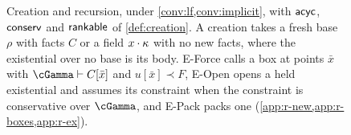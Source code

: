 \begin{figure}[tbp]
  \small
  \figrule
  \caption{Creation and recursion, under \cref{conv:lf,conv:implicit}, with $\mathsf{acyc}$, $\mathsf{conserv}$ and $\mathsf{rankable}$ of \cref{def:creation}. A creation takes a fresh base $\rho$ with facts $C$ or a field $x\cdot \kappa$ with no new facts, where the existential over no base is its body. E-Force calls a box at points $\bar x$ with $\cGamma \vdash C[\bar x]$ and $u[\bar x] \prec F$, E-Open opens a held existential and assumes its constraint when the constraint is conservative over $\cGamma$, and E-Pack packs one (\cref{app:r-new,app:r-boxes,app:r-ex}).}
  \label{fig:typing-orders}
\end{figure}
